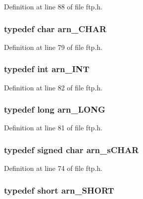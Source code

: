 Definition at line 88 of file ftp.h.

\hypertarget{group__ftp_gab7c92ee10c15b851350edb8a4a3bb708}{
\subsubsection[{arn\_\-CHAR}]{\setlength{\rightskip}{0pt plus 5cm}typedef char {\bf arn\_\-CHAR}}}
\label{group__ftp_gab7c92ee10c15b851350edb8a4a3bb708}


Definition at line 79 of file ftp.h.

\hypertarget{group__ftp_gadfc1beb2750f692d8fc0b488fd53312b}{
\subsubsection[{arn\_\-INT}]{\setlength{\rightskip}{0pt plus 5cm}typedef int {\bf arn\_\-INT}}}
\label{group__ftp_gadfc1beb2750f692d8fc0b488fd53312b}


Definition at line 82 of file ftp.h.

\hypertarget{group__ftp_ga6094b3f192571d7477f6ee0feb3f6258}{
\subsubsection[{arn\_\-LONG}]{\setlength{\rightskip}{0pt plus 5cm}typedef long {\bf arn\_\-LONG}}}
\label{group__ftp_ga6094b3f192571d7477f6ee0feb3f6258}


Definition at line 81 of file ftp.h.

\hypertarget{group__ftp_gac337f9d5cafc356fbdbf5cf13e65ba6d}{
\subsubsection[{arn\_\-sCHAR}]{\setlength{\rightskip}{0pt plus 5cm}typedef signed char {\bf arn\_\-sCHAR}}}
\label{group__ftp_gac337f9d5cafc356fbdbf5cf13e65ba6d}


Definition at line 74 of file ftp.h.

\hypertarget{group__ftp_ga4141624391b35e060d6167502404c3a0}{
\subsubsection[{arn\_\-SHORT}]{\setlength{\rightskip}{0pt plus 5cm}typedef short {\bf arn\_\-SHORT}}}
\label{group__ftp_ga4141624391b35e060d6167502404c3a0}


